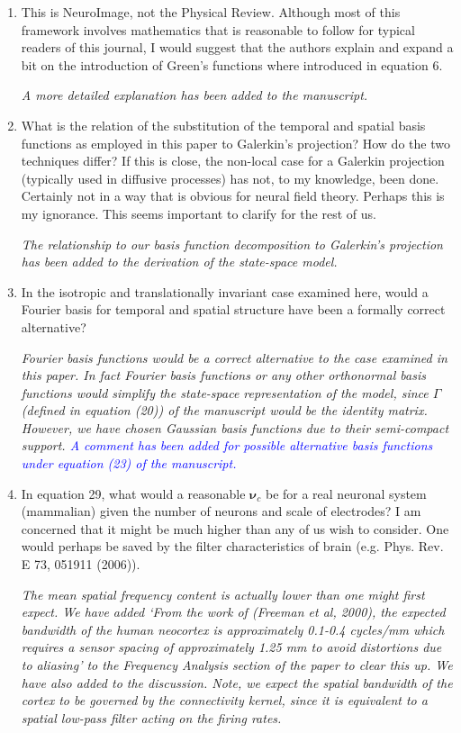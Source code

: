 \documentclass{article}
\newcommand{\parham}[1]{\textcolor{blue}{#1}}
\begin{document}
\begin{enumerate}
\item This is NeuroImage, not the Physical Review. Although most of this framework involves mathematics that is reasonable to follow for typical readers of this journal, I would suggest that the authors explain and expand a bit on the introduction of Green's functions where introduced in equation 6.

\emph{A more detailed explanation has been added to the manuscript.}

\item What is the relation of the substitution of the temporal and spatial basis functions as employed in this paper to Galerkin's projection? How do the two techniques differ? If this is close, the non-local case for a Galerkin projection (typically used in diffusive processes) has not, to my knowledge, been done. Certainly not in a way that is obvious for neural field theory. Perhaps this is my ignorance. This seems important to clarify for the rest of us.

\emph{The relationship to our basis function decomposition to Galerkin's projection has been added to the derivation of the state-space model. }

\item In the isotropic and translationally invariant case examined here, would a Fourier basis for temporal and spatial structure have been a formally correct alternative?

\emph{Fourier basis functions would be a correct alternative to the case examined in this paper. In fact Fourier basis functions or any other orthonormal basis functions would simplify the state-space representation of the model, since $\Gamma$ (defined in equation (20)) of the manuscript would be the identity matrix. However, we have chosen Gaussian basis functions due to their semi-compact support. \parham{A comment has been added for possible alternative basis functions under equation (23) of the manuscript.}}

\item In equation 29, what would a reasonable $\boldsymbol{\nu}_c$ be for a real neuronal system (mammalian) given the number of neurons and scale of electrodes? I am concerned that it might be much higher than any of us wish to consider. One would perhaps be saved by the filter characteristics of brain (e.g. Phys. Rev. E 73, 051911 (2006)).

\emph{The mean spatial frequency content is actually lower than one might first expect. We have added `From the work of (Freeman et al, 2000), the expected bandwidth of the human neocortex is approximately 0.1-0.4 cycles/mm which requires a sensor spacing of approximately 1.25 mm to avoid distortions due to aliasing' to the Frequency Analysis section of the paper to clear this up. We have also added to the discussion. Note, we expect the spatial bandwidth of the cortex to be governed by the connectivity kernel, since it is equivalent to a spatial low-pass filter acting on the firing rates.}


\end{enumerate}
\end{document}
